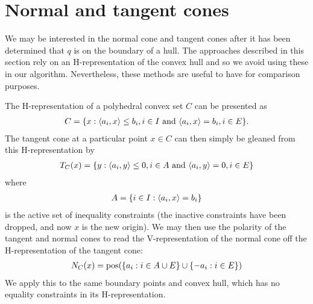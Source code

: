 \section{Normal and tangent cones}
We may be interested in the normal cone and tangent cones after it has been
determined that $q$ is on the boundary of a  hull.  The approaches described
in this section rely on an H-representation of the convex hull and so we avoid 
using these in our algorithm.  Nevertheless, these methods are useful to have for
comparison purposes.

The H-representation of a polyhedral convex set $C$ can be presented as
\begin{align*}
	C = \{ x: \langle a_i, x \rangle \leq b_i, i \in I \text{ and } 
				\langle a_i, x \rangle = b_i, i \in E \}.
\end{align*}
The tangent cone at a particular point $x \in C$ can then simply be gleaned from 
this H-representation by
\begin{align*}
	T_C(x) = \{ y: \langle a_i, y \rangle \leq 0, i \in A \text{ and } 
				\langle a_i, y \rangle = 0, i \in E \}
\end{align*}
where 
\begin{align*}
	A = \{ i \in I: \langle a_i, x \rangle = b_i \}
\end{align*}
is the active set of inequality constraints (the inactive constraints have been
 dropped, and now $x$ is the new origin).
We may then use the polarity of the tangent and normal cones to read the 
V-representation of the normal cone off the H-representation 
of the tangent cone:
\begin{align*}
	N_C(x) = \operatorname{pos}( \{ a_i: i \in A \cup E \} \cup \{ -a_i: i \in E \} )
\end{align*}
We apply this to the same boundary points and convex hull, which has no 
equality constraints in its H-representation.
